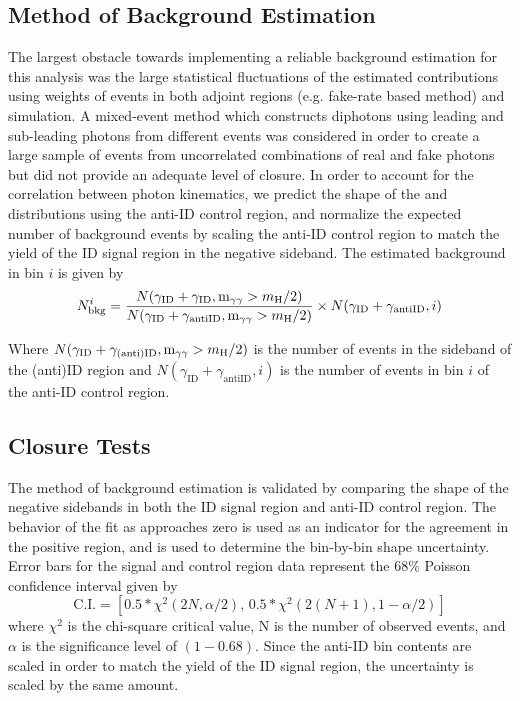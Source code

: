 \subsection{Method of Background Estimation} \label{sec:ana_bkgest}
The largest obstacle towards implementing a reliable background estimation for this analysis was the large statistical fluctuations of the estimated contributions using weights of events in both adjoint regions (e.g. fake-rate based method) and simulation. A mixed-event method which constructs diphotons using leading and sub-leading photons from different events was considered in order to create a large sample of events from uncorrelated combinations of real and fake photons but did not provide an adequate level of closure. In order to account for the correlation between photon kinematics, we predict the shape of the \lxy and \mgg distributions using the anti-ID control region, and normalize the expected number of background events by scaling the anti-ID control region to match the yield of the ID signal region in the negative \lxy sideband. The estimated background in bin $i$ is given by
\begin{equation}
	\label{eq:background}
	N_{\mathrm{bkg}}^{i} = \frac{N(\gamma_\mathrm{ID}+\gamma_\mathrm{ID}, \text{m}_{\gamma\gamma} > m_{\mathrm{H}}\space/2)}{N(\gamma_\mathrm{ID}+\gamma_\mathrm{antiID}, \text{m}_{\gamma\gamma} > m_{\mathrm{H}}\space/2)}\times N(\gamma_\mathrm{ID}+\gamma_\mathrm{antiID}, i)
\end{equation}

Where $N(\gamma_\mathrm{ID}+\gamma_\mathrm{(anti)ID}, \text{m}_{\gamma\gamma} > m_{\mathrm{H}}\space/2)$ is the number of events in the \lxy sideband of the (anti)ID region and $N(\gamma_\mathrm{ID}+\gamma_\mathrm{antiID}, i)$ is the number of events in bin $i$ of the anti-ID control region. 

\subsection{Closure Tests} \label{sec:ana_bkgclosure}
The method of background estimation is validated by comparing the shape of the negative \lxy sidebands in both the ID signal region and anti-ID control region. The behavior of the fit as \lxy approaches zero is used as an indicator for the agreement in the positive \lxy region, and is used to determine the bin-by-bin shape uncertainty. Error bars for the signal and control region data represent the $68\%$ Poisson confidence interval given by
\begin{equation}
	\text{C.I.}=\left[0.5*\chi^2(2N, \alpha/2),\, 0.5*\chi^2(2(N+1), 1-\alpha/2)\right]
\end{equation}
where $\chi^2$ is the chi-square critical value, N is the number of observed events, and $\alpha$ is the significance level of $(1-0.68)$. Since the anti-ID bin contents are scaled in order to match the yield of the ID signal region, the uncertainty is scaled by the same amount.

